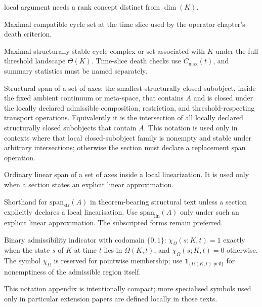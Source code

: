\begin{description}
        local argument needs a rank concept distinct from \(\dim(K)\).
  \item[\(C_{\max}(t)\)] Maximal compatible cycle set at the time slice used by
        the operator chapter's death criterion.
  \item[\(C_{\max}(K)\)] Maximal structurally stable cycle complex or set
        associated with \(K\) under the full threshold landscape
        \(\Theta(K)\). Time-slice death checks use \(C_{\max}(t)\), and
        summary statistics must be named separately.
  \item[\(\mathrm{span}_{\mathrm{str}}(A)\)] Structural span of a set of
        axes: the smallest structurally closed subobject, inside the fixed
        ambient continuum or meta-space, that contains \(A\) and is closed
        under the locally declared admissible composition, restriction, and
        threshold-respecting transport operations. Equivalently it is the
        intersection of all locally declared structurally closed subobjects
        that contain \(A\). This notation is used only in contexts where that
        local closed-subobject family is nonempty and stable under arbitrary
        intersections; otherwise the section must declare a replacement span
        operation.
  \item[\(\mathrm{span}_{\mathrm{lin}}(A)\)] Ordinary linear span of a set of
        axes inside a local linearization. It is used only when a section
        states an explicit linear approximation.
  \item[\(\mathrm{span}(A)\)] Shorthand for
        \(\mathrm{span}_{\mathrm{str}}(A)\) in theorem-bearing structural
        text unless a section explicitly declares a local linearisation. Use
        \(\mathrm{span}_{\mathrm{lin}}(A)\) only under such an explicit linear
        approximation. The subscripted forms remain preferred.
  \item[\(\chi_{\Omega}(s;K,t)\)] Binary admissibility indicator with codomain
        \(\{0,1\}\): \(\chi_{\Omega}(s;K,t)=1\) exactly when the state \(s\)
        of \(K\) at time \(t\) lies in \(\Omega(K,t)\), and
        \(\chi_{\Omega}(s;K,t)=0\) otherwise. The symbol
        \(\chi_{\Omega}\) is reserved for pointwise membership; use
        \(\mathbf{1}_{\{\Omega(K,t)\neq\emptyset\}}\) for nonemptiness of the
        admissible region itself.
\end{description}

This notation appendix is intentionally compact; more specialised symbols used
only in particular extension papers are defined locally in those texts.

\endgroup
